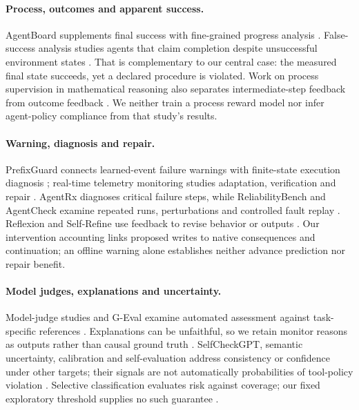\paragraph{Process, outcomes and apparent success.}
AgentBoard supplements final success with fine-grained progress analysis \citep{ma2024agentboard}. False-success analysis studies agents that claim completion despite unsuccessful environment states \citep{advani2026false}. That is complementary to our central case: the measured final state succeeds, yet a declared procedure is violated. Work on process supervision in mathematical reasoning also separates intermediate-step feedback from outcome feedback \citep{lightman2023verify}. We neither train a process reward model nor infer agent-policy compliance from that study's results.

\paragraph{Warning, diagnosis and repair.}
PrefixGuard connects learned-event failure warnings with finite-state execution diagnosis \citep{huang2026prefix}; real-time telemetry monitoring studies adaptation, verification and repair \citep{dubey2026monitor}. AgentRx diagnoses critical failure steps, while ReliabilityBench and AgentCheck examine repeated runs, perturbations and controlled fault replay \citep{barke2026agentrx,reliability2026,mazumder2026agentcheck}. Reflexion and Self-Refine use feedback to revise behavior or outputs \citep{shinn2023reflexion,madaan2023selfrefine}. Our intervention accounting links proposed writes to native consequences and continuation; an offline warning alone establishes neither advance prediction nor repair benefit.

\paragraph{Model judges, explanations and uncertainty.}
Model-judge studies and G-Eval examine automated assessment against task-specific references \citep{zheng2023judge,liu2023geval}. Explanations can be unfaithful, so we retain monitor reasons as outputs rather than causal ground truth \citep{turpin2023unfaithful}. SelfCheckGPT, semantic uncertainty, calibration and self-evaluation address consistency or confidence under other targets; their signals are not automatically probabilities of tool-policy violation \citep{manakul2023selfcheck,kuhn2023semantic,guo2017calibration,kadavath2022know}. Selective classification evaluates risk against coverage; our fixed exploratory threshold supplies no such guarantee \citep{geifman2017selective}.

